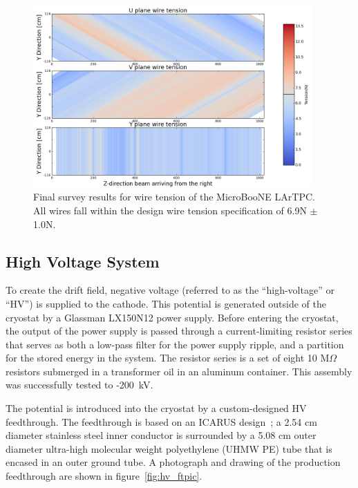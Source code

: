 \begin{figure}
\centering
\includegraphics[width=0.95\textwidth]{figures/WireTension_201605_updatedcolors.png}
\caption{Final survey results for wire tension of the MicroBooNE LArTPC. All wires fall within the design wire tension specification of 6.9N $\pm$ 1.0N.}
\label{fig:heatmap}
\end{figure} 





%
\subsection{High Voltage System}
\label{sec:hv}

To create the drift field, negative voltage (referred to as the ``high-voltage'' or ``HV'') is supplied to the \lartpc cathode.  This potential is generated outside of the cryostat by a Glassman LX150N12 power supply.  Before entering the cryostat, the output of the power supply is passed through a current-limiting resistor series that serves as both a low-pass filter for the power supply ripple, and a partition for the stored energy in the system.  The resistor series is a set of eight 10 M$\Omega$ resistors submerged in a transformer oil in an aluminum container.  This assembly was successfully tested to -200~kV. 

The potential is introduced into the cryostat by a custom-designed HV feedthrough.  The feedthrough is based on an ICARUS design~\cite{Amerio:2004-T600}; a 2.54 cm diameter stainless steel inner conductor is surrounded by a 5.08 cm outer diameter ultra-high molecular weight polyethylene (UHMW PE) tube that is encased in an outer ground tube.  A photograph and drawing of the production feedthrough are shown in figure~\ref{fig:hv_ftpic}.

